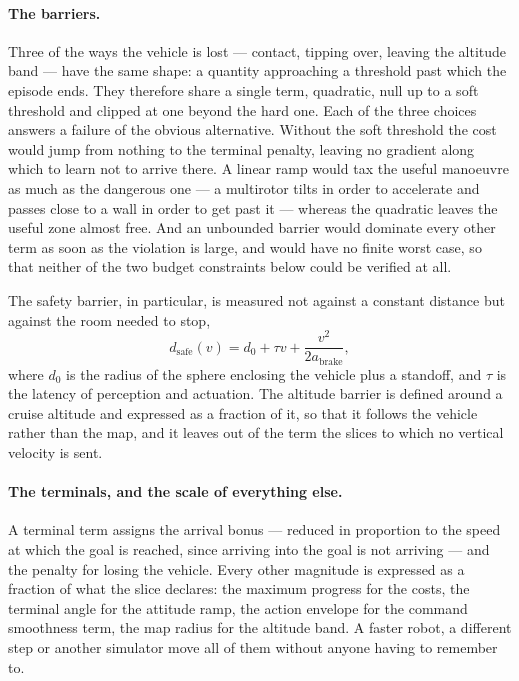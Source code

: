 \paragraph{The barriers.}
Three of the ways the vehicle is lost --- contact, tipping over, leaving the
altitude band --- have the same shape: a quantity approaching a threshold past
which the episode ends. They therefore share a single term, quadratic, null up
to a soft threshold and clipped at one beyond the hard one. Each of the three
choices answers a failure of the obvious alternative. Without the soft threshold
the cost would jump from nothing to the terminal penalty, leaving no gradient
along which to learn not to arrive there. A linear ramp would tax the useful
manoeuvre as much as the dangerous one --- a multirotor tilts in order to
accelerate and passes close to a wall in order to get past it --- whereas the
quadratic leaves the useful zone almost free. And an unbounded barrier would
dominate every other term as soon as the violation is large, and would have no
finite worst case, so that neither of the two budget constraints below could be
verified at all.

The safety barrier, in particular, is measured not against a constant distance
but against the room needed to stop,
\begin{equation}
  d_{\text{safe}}(v) = d_0 + \tau v + \frac{v^2}{2 a_{\text{brake}}},
  \label{eq:stopping}
\end{equation}
where $d_0$ is the radius of the sphere enclosing the vehicle plus a standoff,
and $\tau$ is the latency of perception and actuation. The altitude barrier is
defined around a cruise altitude and expressed as a fraction of it, so that it
follows the vehicle rather than the map, and it leaves out of the term the
slices to which no vertical velocity is sent.

\paragraph{The terminals, and the scale of everything else.}
A terminal term assigns the arrival bonus --- reduced in proportion to the speed
at which the goal is reached, since arriving into the goal is not arriving ---
and the penalty for losing the vehicle. Every other magnitude is expressed as a
fraction of what the slice declares: the maximum progress for the costs, the
terminal angle for the attitude ramp, the action envelope for the command
smoothness term, the map radius for the altitude band. A faster robot, a
different step or another simulator move all of them without anyone having to
remember to.

